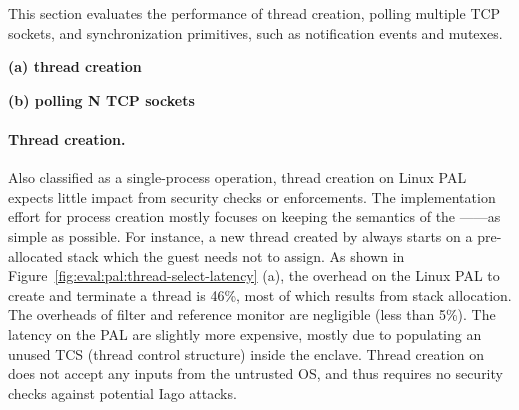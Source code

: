 \label{sec:eval:pal:sched}

This section evaluates the performance of thread creation,
polling multiple TCP sockets,
and synchronization primitives, such as notification events and mutexes. 


\begin{figure*}[t!]
\centering
\footnotesize
{}
\parbox{0.49\textwidth}{\centering\bf (a) thread creation}
\parbox{0.49\textwidth}{\centering\bf (b) polling N TCP sockets}
\caption{(a) Thread creation latency and (b) latency of polling a number of TCP sockets.
Lower is better.
The comparison is between (1)  and  on Linux; (2)  and  on the Linux PAL, with and without a \seccomp{} filter ({\bf +SC}) and reference monitor ({\bf +RM}); (3) the same \hostapis{} on the \sgx{} PAL.}
\label{fig:eval:pal:thread-select-latency}
\end{figure*}


\paragraph{Thread creation.}
Also classified as a single-process operation,
thread creation on Linux PAL
expects little impact from security checks or enforcements.
The implementation effort
for process creation mostly focuses on keeping the semantics of the \hostapi{}------as simple as possible.
For instance, a new thread created by  always starts
on a pre-allocated stack
which the guest needs not to assign.
As shown in
Figure~\ref{fig:eval:pal:thread-select-latency} (a),
the overhead
on the Linux PAL
to create and terminate a thread
is \roughly{}46\%,
most of which results from stack allocation.
The overheads of \seccomp{} filter and reference monitor are negligible (less than 5\%).
The latency on the \sgx{} PAL
are slightly more expensive, mostly due to
populating an unused TCS (thread control structure) inside the enclave.
Thread creation on \sgx{} does not accept any inputs
from the untrusted OS,
and thus requires no security checks
against potential Iago attacks.





